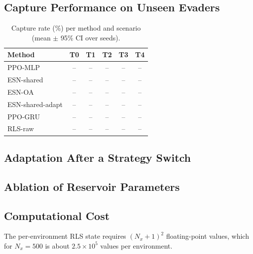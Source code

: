 \subsection{Capture Performance on Unseen Evaders}
\noindent
\begin{table}[t]
    \caption[Capture performance against unseen evaders]{Capture rate (\%) per method and scenario (mean $\pm$ 95\% CI over seeds).}
    \label{tab:esn-capture}
    \begin{center}
        \begin{tabular}{lccccc}
            \hline\hline
            Method           & T0 & T1 & T2 & T3 & T4 \\
            \hline
            PPO-MLP          & -- & -- & -- & -- & -- \\
            ESN-shared       & -- & -- & -- & -- & -- \\
            ESN-OA           & -- & -- & -- & -- & -- \\
            ESN-shared-adapt & -- & -- & -- & -- & -- \\
            PPO-GRU          & -- & -- & -- & -- & -- \\
            RLS-raw          & -- & -- & -- & -- & -- \\
            \hline\hline
        \end{tabular}
    \end{center}
\end{table}

\subsection{Adaptation After a Strategy Switch}
\noindent

\subsection{Ablation of Reservoir Parameters}
\noindent

\subsection{Computational Cost}
\noindent
The per-environment RLS state requires $(N_x+1)^2$ floating-point values, which for $N_x = 500$ is about $2.5 \times 10^5$ values per environment.

